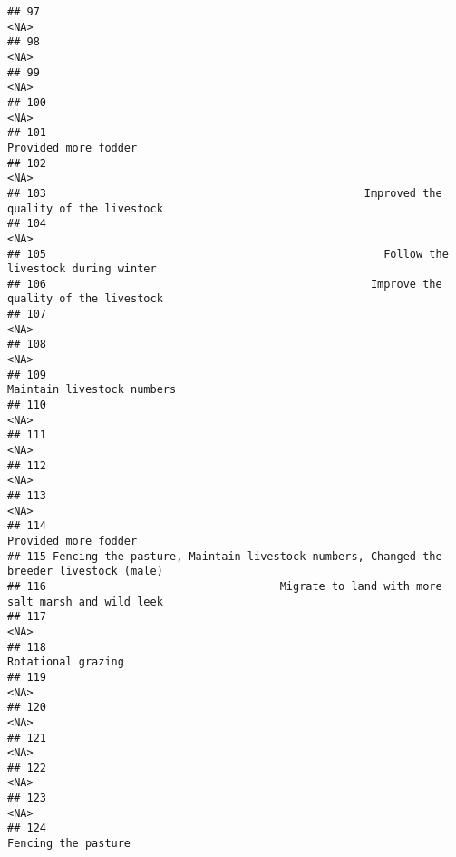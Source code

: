 \documentclass[
]{article}
\begin{document}
\begin{verbatim}
## 97                                                                                   <NA>
## 98                                                                                   <NA>
## 99                                                                                   <NA>
## 100                                                                                  <NA>
## 101                                                                  Provided more fodder
## 102                                                                                  <NA>
## 103                                                 Improved the quality of the livestock
## 104                                                                                  <NA>
## 105                                                    Follow the livestock during winter
## 106                                                  Improve the quality of the livestock
## 107                                                                                  <NA>
## 108                                                                                  <NA>
## 109                                                            Maintain livestock numbers
## 110                                                                                  <NA>
## 111                                                                                  <NA>
## 112                                                                                  <NA>
## 113                                                                                  <NA>
## 114                                                                  Provided more fodder
## 115 Fencing the pasture, Maintain livestock numbers, Changed the breeder livestock (male)
## 116                                    Migrate to land with more salt marsh and wild leek
## 117                                                                                  <NA>
## 118                                                                    Rotational grazing
## 119                                                                                  <NA>
## 120                                                                                  <NA>
## 121                                                                                  <NA>
## 122                                                                                  <NA>
## 123                                                                                  <NA>
## 124                                                                   Fencing the pasture

\end{verbatim}
\end{document}
